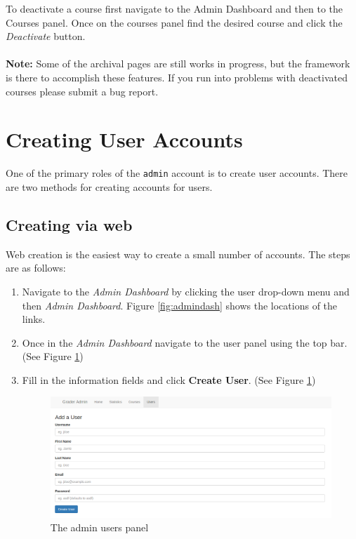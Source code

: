\documentclass[11pt]{report}
\begin{document}
To deactivate a course first navigate to the Admin Dashboard and then to the Courses panel. Once on the courses
panel find the desired course and click the \emph{Deactivate} button.
\\
\\
\noindent\textbf{Note:} Some of the archival pages are still works in progress, but the framework is there to
accomplish these features. If you run into problems with deactivated courses please submit a bug report.



\section{Creating User Accounts}
\label{sec:createusers}
One of the primary roles of the \texttt{admin} account is to create user accounts. There are two methods
for creating accounts for users.

\subsection{Creating via web}
Web creation is the easiest way to create a small number of accounts. The steps are as follows:

\begin{enumerate}
\item Navigate to the \emph{Admin Dashboard} by clicking the user drop-down menu and then \emph{Admin Dashboard}. Figure \ref{fig:admindash} shows the locations of the links.

\item Once in the \emph{Admin Dashboard} navigate to the user panel using the top bar. (See Figure \ref{fig:adminuser})
\item Fill in the information fields and click \textbf{Create User}. (See Figure \ref{fig:adminuser})

\begin{figure}[h]
\centering
\includegraphics[width=\textwidth,height=\textheight,keepaspectratio]{diagrams/admin_users}
\caption{The admin users panel}
\label{fig:adminuser}
\end{figure}
\end{enumerate}
\end{document}
